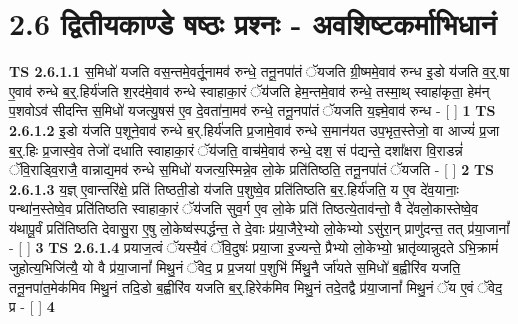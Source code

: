 \documentclass[17pt]{extarticle}
\begin{document}
     \section*{ 2.6      द्वितीयकाण्डे षष्ठः प्रश्नः - अवशिष्टकर्माभिधानं }
                                        \textbf{ TS 2.6.1.1} \newline
                  स॒मिधो॑ यजति वस॒न्तमे॒वर्तू॒नामव॑ रुन्धे॒ तनू॒नपा॑तं ॅयजति ग्री॒ष्ममे॒वाव॑ रुन्ध इ॒डो य॑जति व॒र्॒.षा ए॒वाव॑ रुन्धे ब॒र्॒.हिर्य॑जति श॒रद॑मे॒वाव॑ रुन्धे स्वाहाका॒रं ॅय॑जति हेम॒न्तमे॒वाव॑ रुन्धे॒ तस्मा॒थ् स्वाहा॑कृता॒ हेम॑न् प॒शवोऽव॑ सीदन्ति स॒मिधो॑ यजत्यु॒षस॑ ए॒व दे॒वता॑ना॒मव॑ रुन्धे॒ तनू॒नपा॑तं ॅयजति य॒ज्ञ्मे॒वाव॑ रुन्ध - [  ] \textbf{  1} \newline
                  \newline
                                \textbf{ TS 2.6.1.2} \newline
                  इ॒डो य॑जति प॒शूने॒वाव॑ रुन्धे ब॒र्.हिर्य॑जति प्र॒जामे॒वाव॑ रुन्धे स॒मान॑यत उप॒भृत॒स्तेजो॒ वा आज्यं॑ प्र॒जा ब॒र्॒.हिः प्र॒जास्वे॒व तेजो॑ दधाति स्वाहाका॒रं ॅय॑जति॒ वाच॑मे॒वाव॑ रुन्धे॒ दश॒ सं प॑द्यन्ते॒ दशा᳚क्षरा वि॒राडन्नं॑ ॅवि॒राड्वि॒राजै॒ वान्नाद्य॒मव॑ रुन्धे स॒मिधो॑ यजत्य॒स्मिन्ने॒व लो॒के प्रति॑तिष्ठति॒ तनू॒नपा॑तं ॅयजति - [  ] \textbf{  2} \newline
                  \newline
                                \textbf{ TS 2.6.1.3} \newline
                  य॒ज्ञ् ए॒वान्तरि॑क्षे॒ प्रति॑ तिष्ठती॒डो य॑जति प॒शुष्वे॒व प्रति॑तिष्ठति ब॒र॒.हिर्य॑जति॒ य ए॒व दे॑व॒यानाः॒ पन्था॑न॒स्तेष्वे॒व प्रति॑तिष्ठति स्वाहाका॒रं ॅय॑जति सुव॒र्ग ए॒व लो॒के प्रति॑ तिष्ठत्ये॒ताव॑न्तो॒ वै दे॑वलो॒कास्तेष्वे॒व य॑थापू॒र्वं प्रति॑तिष्ठति देवासु॒रा ए॒षु लो॒केष्व॑स्पर्द्धन्त॒ ते दे॒वाः प्र॑या॒जैरे॒भ्यो लो॒केभ्यो ऽसु॑रा॒न् प्राणु॑दन्त॒ तत् प्र॑या॒जानां᳚ - [  ] \textbf{  3} \newline
                  \newline
                                \textbf{ TS 2.6.1.4} \newline
                  प्रयाज॒त्वं ॅयस्यै॒वं ॅवि॒दुषः॑ प्रया॒जा इ॒ज्यन्ते॒ प्रैभ्यो लो॒केभ्यो॒ भ्रातृ॑व्यान्नुदते ऽभि॒क्रामं॑ जुहोत्य॒भिजि॑त्यै॒ यो वै प्र॑या॒जानां᳚ मिथु॒नं ॅवेद॒ प्र प्र॒जया॑ प॒शुभि॑ र्मिथु॒नै र्जा॑यते स॒मिधो॑ ब॒ह्वीरि॑व यजति॒ तनू॒नपा॑त॒मेक॑मिव मिथु॒नं तदि॒डो ब॒ह्वीरि॑व यजति ब॒र्॒.हिरेक॑मिव मिथु॒नं तदे॒तद्वै प्र॑या॒जानां᳚ मिथु॒नं ॅय ए॒वं ॅवेद॒ प्र - [  ] \textbf{  4} \newline
                  \newline
\end{document}
